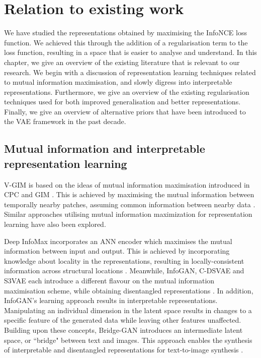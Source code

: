 
\chapter{Relation to existing work}

We have studied the representations obtained by maximising the InfoNCE loss function. We achieved this through the addition of a regularisation term to the loss function, resulting in a space that is easier to analyse and understand. In this chapter, we give an overview of the existing literature that is relevant to our research. We begin with a discussion of representation learning techniques related to mutual information maximisation, and slowly digress into interpretable representations. Furthermore, we give an overview of the existing regularisation techniques used for both improved generalisation and better representations. Finally, we give an overview of alternative priors that have been introduced to the VAE framework in the past decade.


\section{Mutual information and interpretable representation learning}

	V-GIM is based on the ideas of mutual information maximisation introduced in CPC and GIM \cite{lowePuttingEndEndtoEnd2020, oordRepresentationLearningContrastive2019}. This is achieved by maximising the mutual information between temporally nearby patches, assuming common information between nearby data \cite{lowePuttingEndEndtoEnd2020}. Similar approaches utilising mutual information maximization for representation learning have also been explored.
	
	Deep InfoMax incorporates an ANN encoder which maximises the mutual information between input and output. This is achieved by incorporating knowledge about locality in the representations, resulting in locally-consistent information across structural locations \cite{hjelmLearningDeepRepresentations2019}. Meanwhile, InfoGAN, C-DSVAE and S3VAE each introduce a different flavour on the mutual information maximisation scheme, while obtaining disentangled representations \cite{chenInfoGANInterpretableRepresentation2016, baiContrastivelyDisentangledSequential2021, zhuS3VAESelfSupervisedSequential2020}. In addition, InfoGAN's learning approach results in interpretable representations. Manipulating an individual dimension in the latent space results in changes to a specific feature of the generated data while leaving other features unaffected. Building upon these concepts, Bridge-GAN introduces an intermediate latent space, or ``bridge" between text and images. This approach enables the synthesis of interpretable and disentangled representations for text-to-image synthesis \cite{yuanBridgeGANInterpretableRepresentation2020}.
	

